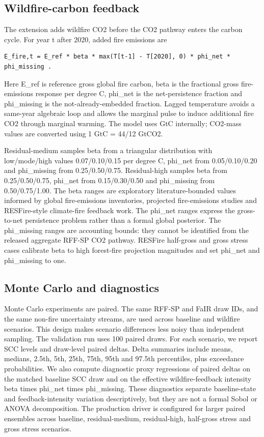 \documentclass[12pt]{article}
\begin{document}
\subsection{Wildfire-carbon feedback}\label{wildfire-carbon-feedback}

The extension adds wildfire CO2 before the CO2 pathway enters the carbon
cycle. For year t after 2020, added fire emissions are

\begin{verbatim}
E_fire,t = E_ref * beta * max(T[t-1] - T[2020], 0) * phi_net * phi_missing .
\end{verbatim}

Here E\_ref is reference gross global fire carbon, beta is the
fractional gross fire-emissions response per degree C, phi\_net is the
net-persistence fraction and phi\_missing is the not-already-embedded
fraction. Lagged temperature avoids a same-year algebraic loop and
allows the marginal pulse to induce additional fire CO2 through marginal
warming. The model uses GtC internally; CO2-mass values are converted
using 1 GtC = 44/12 GtCO2.

Residual-medium samples beta from a triangular distribution with
low/mode/high values 0.07/0.10/0.15 per degree C, phi\_net from
0.05/0.10/0.20 and phi\_missing from 0.25/0.50/0.75. Residual-high
samples beta from 0.25/0.50/0.75, phi\_net from 0.15/0.30/0.50 and
phi\_missing from 0.50/0.75/1.00. The beta ranges are exploratory
literature-bounded values informed by global fire-emissions inventories,
projected fire-emissions studies and RESFire-style climate-fire feedback
work. The phi\_net ranges express the gross-to-net persistence problem
rather than a formal global posterior. The phi\_missing ranges are
accounting bounds: they cannot be identified from the released aggregate
RFF-SP CO2 pathway. RESFire half-gross and gross stress cases calibrate
beta to high forest-fire projection magnitudes and set phi\_net and
phi\_missing to one.

\subsection{Monte Carlo and
diagnostics}\label{monte-carlo-and-diagnostics}

Monte Carlo experiments are paired. The same RFF-SP and FaIR draw IDs,
and the same non-fire uncertainty streams, are used across baseline and
wildfire scenarios. This design makes scenario differences less noisy
than independent sampling. The validation run uses 100 paired draws. For
each scenario, we report SCC levels and draw-level paired deltas. Delta
summaries include means, medians, 2.5th, 5th, 25th, 75th, 95th and
97.5th percentiles, plus exceedance probabilities. We also compute
diagnostic proxy regressions of paired deltas on the matched baseline
SCC draw and on the effective wildfire-feedback intensity beta times
phi\_net times phi\_missing. These diagnostics separate baseline-state
and feedback-intensity variation descriptively, but they are not a
formal Sobol or ANOVA decomposition. The production driver is configured
for larger paired ensembles across baseline, residual-medium,
residual-high, half-gross stress and gross stress scenarios.
\end{document}
